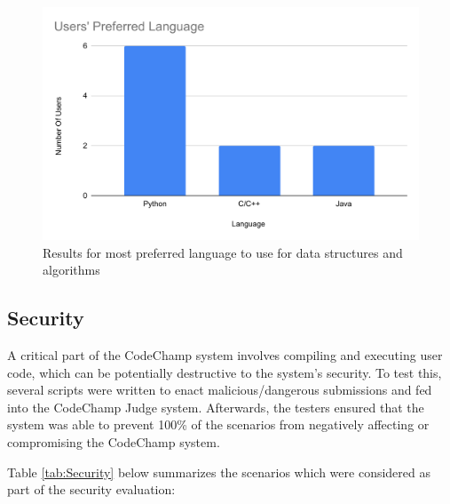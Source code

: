 \documentclass[12pt, titlepage]{article}
\begin{document}
\begin{itemize}
    \begin{figure}[H]
    \centering
    \includegraphics[width=1\textwidth]{question4chart.pdf}
    
    \caption{Results for most preferred language to use for data structures and algorithms}
    
    \label{FigUH-4}
    \end{figure}
    
\end{itemize}

\subsection{Security}\label{sec:security}
A critical part of the CodeChamp system involves compiling and executing user code, which can be potentially destructive to the system's security. To test this, several scripts were written to enact malicious/dangerous submissions and fed into the CodeChamp Judge system. Afterwards, the testers ensured that the system was able to prevent 100\% of the scenarios from negatively affecting or compromising the CodeChamp system.

Table \ref{tab:Security} below summarizes the scenarios which were considered as part of the security evaluation:
\end{document}
